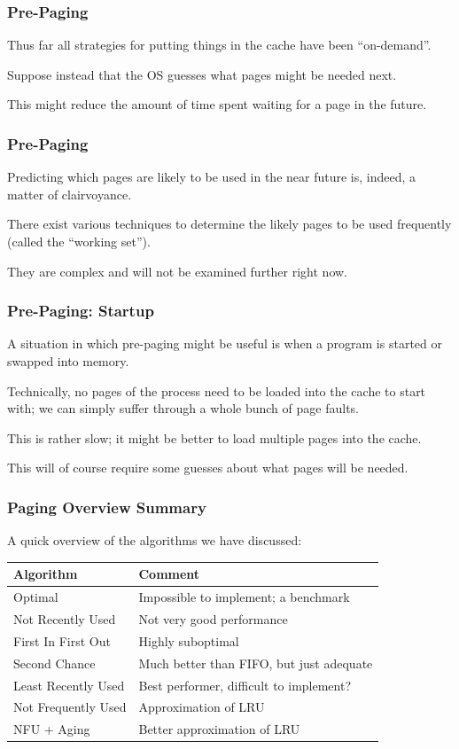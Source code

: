 \begin{frame}
\frametitle{Pre-Paging}

Thus far all strategies for putting things in the cache have been ``on-demand''.
 
Suppose instead that the OS guesses what pages might be needed next.

This might reduce the amount of time spent waiting for a page in the future.

\end{frame}

\begin{frame}
\frametitle{Pre-Paging}

Predicting which pages are likely to be used in the near future is, indeed, a matter of clairvoyance. 

There exist various techniques to determine the likely pages to be used frequently (called the ``working set'').

They are complex and will not be examined further right now.

\end{frame}

\begin{frame}
\frametitle{Pre-Paging: Startup}

A situation in which pre-paging might be useful is when a program is started or swapped into memory. 

Technically, no pages of the process need to be loaded into the cache to start with; we can simply suffer through a whole bunch of page faults. 

This is rather slow; it might be better to load multiple pages into the cache.

This will of course require some guesses about what pages will be needed.

\end{frame}

\begin{frame}
\frametitle{Paging Overview Summary}

A quick overview of the algorithms we have discussed:

\begin{center}
\begin{tabular}{l|l}
	\textbf{Algorithm} & \textbf{Comment} \\ \hline
	Optimal & Impossible to implement; a benchmark\\
	Not Recently Used &  Not very good performance \\
	First In First Out & Highly suboptimal \\
	Second Chance & Much better than FIFO, but just adequate \\
	Least Recently Used & Best performer, difficult to implement? \\
	Not Frequently Used & Approximation of LRU \\
	NFU + Aging & Better approximation of LRU\\
\end{tabular}
\end{center}


\end{frame}

